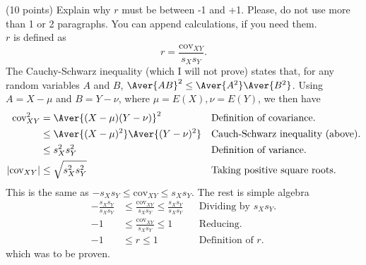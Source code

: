 \documentclass[onecolumn,10pt]{jhwhw}
\begin{document}
\clearpage
\problem{}
(10 points) Explain why $r$ must be between -1 and +1. Please, do not use more than 1 or 2 paragraphs. You can append calculations, if you need them.\\

\noindent $r$ is defined as
$$r = \frac{\mbox{cov}_{XY}}{s_X s_Y}.$$
The Cauchy-Schwarz inequality (which I will not prove) states that, for any random variables $A$ and $B$, $\Aver{AB}^2 \leq \Aver{A^2} \Aver{B^2}$. Using $A=X-\mu$ and $B=Y-\nu$, where $\mu=E(X), \nu=E(Y)$, we then have
\begin{align*}
\mbox{cov}_{XY}^2 & = \Aver{(X-\mu)(Y-\nu)}^2 && \text{Definition of covariance.}           \\
                    & \leq \Aver{(X-\mu)^2}\Aver{(Y-\nu)^2}  && \text{Cauch-Schwarz inequality (above).}       \\
                    & \leq s_X^2 s_Y^2  && \text{Definition of variance.}\\
|\mbox{cov}_{XY}|   & \leq \sqrt{s_X^2 s_Y^2}  && \text{Taking positive square roots.}
\end{align*}
This is the same as $-s_X s_Y \leq \mbox{cov}_{XY} \leq s_X s_Y$. The rest is simple algebra
\begin{align*}
-\frac{s_X s_Y}{s_X s_Y} & \leq \frac{\mbox{cov}_{XY}}{s_X s_Y} \leq \frac{s_X s_Y}{s_X s_Y} && \text{Dividing by $s_X s_Y$.}\\
-1 & \leq \frac{\mbox{cov}_{XY}}{s_X s_Y} \leq 1  && \text{Reducing.}\\
-1 & \leq r \leq 1  && \text{Definition of $r$.}
\end{align*}
which was to be proven.
\end{document}
